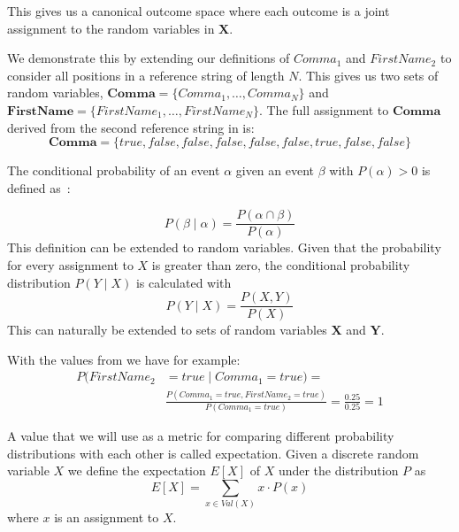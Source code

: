 This gives us a \gls{canonical outcome space} where each outcome is a joint assignment to the \glspl{random variable} in $\mathbf{X}$.

We demonstrate this by extending our definitions of $Comma_1$ and $FirstName_2$ to consider all positions in a reference string of length $N$.
This gives us two sets of \glspl{random variable}, $\mathbf{Comma}=\{Comma_1, \dots, Comma_N\}$ and $\mathbf{FirstName}=\{FirstName_1, \dots, FirstName_N\}$.
The full assignment to $\mathbf{Comma}$ derived from the second reference string in  is:
\begin{equation*}
  \mathbf{Comma}=\{true, false, false, false, false, false, true, false, false\}
\end{equation*}


\bigskip

The \gls{conditional probability} of an \gls{event} $\alpha$ given an \gls{event} $\beta$ with $P(\alpha)>0$ is defined as~\cite{koller2009probabilistic}:

\begin{equation}
\label{equ:conditional-probability-event}
P(\beta\mid\alpha) = \frac{P(\alpha\cap\beta)}{P(\alpha)}
\end{equation}
This definition can be extended to \glspl{random variable}.
Given that the probability for every assignment to $X$ is greater than zero, the \gls{conditional probability distribution} $P(Y\mid X)$ is calculated with
\begin{equation}
\label{equ:conditional-probability-random-variable}
P(Y\mid X) = \frac{P(X,Y)}{P(X)}
\end{equation}
This can naturally be extended to sets of \glspl{random variable} $\mathbf{X}$ and $\mathbf{Y}$.

With the values from  we have for example:
\begin{equation*}
  \begin{split}
    P(FirstName_2&{=}true\mid Comma_1{=}true) = \\
    &\frac{P(Comma_1{=}true, FirstName_2{=}true)}{P(Comma_1{=}true)}=\frac{0.25}{0.25}=1
  \end{split}
\end{equation*}

\bigskip

A value that we will use as a metric for comparing different \glspl{probability distribution} with each other is called \gls{expectation}.
Given a discrete \gls{random variable} $X$ we define the expectation $E[X]$ of $X$ under the distribution $P$ as~\cite{koller2009probabilistic}
\begin{equation}
  \label{equ:expectation-x}
  E[X]=\sum_{x\in Val(X)} x\cdot P(x)
\end{equation}
where $x$ is an assignment to $X$.

